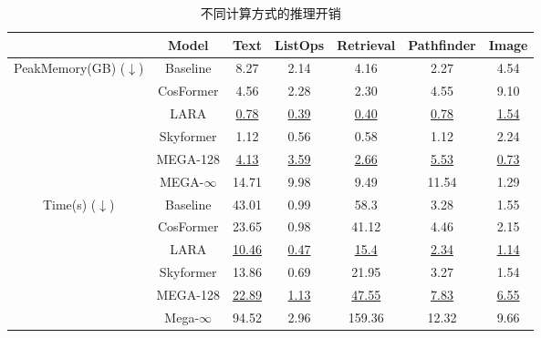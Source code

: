 \begin{table}[htbp]
  \centering
  \caption{不同计算方式的推理开销}
    \begin{tabular}{c|c|ccccc}
    \hline
          & Model & Text  & ListOps & Retrieval & Pathfinder & Image \bigstrut\\
    \hline
    \multicolumn{1}{c|}{\multirow{6}[4]{*}{PeakMemory(GB) ($\downarrow$)}} & Baseline & 8.27  & 2.14  & 4.16  & 2.27  & 4.54  \bigstrut[t]\\
          & CosFormer & 4.56  & 2.28  & 2.30  & 4.55  & 9.10  \\
          & LARA  & \underline{0.78} & \underline{0.39} & \underline{0.40} & \underline{0.78} & \underline{1.54} \\
          & Skyformer & 1.12  & 0.56  & 0.58  & 1.12  & 2.24  \bigstrut[b]\\
\cline{2-7}          & MEGA-128 & \underline{4.13} & \underline{3.59} & \underline{2.66} & \underline{5.53} & \underline{0.73} \bigstrut[t]\\
          & MEGA-$\infty$ & 14.71  & 9.98  & 9.49  & 11.54  & 1.29  \bigstrut[b]\\
    \hline
    \multirow{6}[4]{*}{Time(s) ($\downarrow$)} & Baseline & 43.01 & 0.99  & 58.3  & 3.28  & 1.55 \bigstrut[t]\\
          & CosFormer & 23.65 & 0.98  & 41.12 & 4.46  & 2.15 \\
          & LARA  & \underline{10.46} & \underline{0.47} & \underline{15.4} & \underline{2.34} & \underline{1.14} \\
          & Skyformer & 13.86 & 0.69  & 21.95 & 3.27  & 1.54 \bigstrut[b]\\
\cline{2-7}          & MEGA-128 & \underline{22.89} & \underline{1.13} & \underline{47.55} & \underline{7.83} & \underline{6.55} \bigstrut[t]\\
          & Mega-$\infty$ & 94.52  & 2.96  & 159.36  & 12.32  & 9.66  \bigstrut[b]\\
    \hline
    \end{tabular}%
  \label{tab:inference}%
\end{table}%
